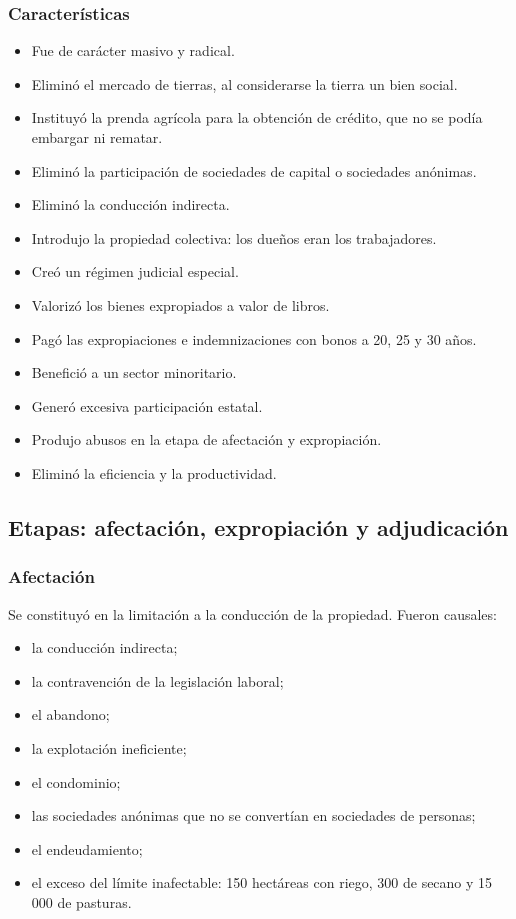\documentclass[
  man,
  floatsintext,
  longtable,
  a4paper,
  nolmodern,
  notxfonts,
  notimes,
  12pt,
  colorlinks=true,linkcolor=blue,citecolor=blue,urlcolor=blue]{apa7}
\providecommand{\tightlist}{%
  \setlength{\itemsep}{0pt}\setlength{\parskip}{0pt}}
\begin{document}
\subsubsection{Características}\label{caracteruxedsticas}

\begin{itemize}
\tightlist
\item
  Fue de carácter masivo y radical.
\item
  Eliminó el mercado de tierras, al considerarse la tierra un bien
  social.
\item
  Instituyó la prenda agrícola para la obtención de crédito, que no se
  podía embargar ni rematar.
\item
  Eliminó la participación de sociedades de capital o sociedades
  anónimas.
\item
  Eliminó la conducción indirecta.
\item
  Introdujo la propiedad colectiva: los dueños eran los trabajadores.
\item
  Creó un régimen judicial especial.
\item
  Valorizó los bienes expropiados a valor de libros.
\item
  Pagó las expropiaciones e indemnizaciones con bonos a 20, 25 y 30
  años.
\item
  Benefició a un sector minoritario.
\item
  Generó excesiva participación estatal.
\item
  Produjo abusos en la etapa de afectación y expropiación.
\item
  Eliminó la eficiencia y la productividad.
\end{itemize}

\subsection{Etapas: afectación, expropiación y
adjudicación}\label{etapas-afectaciuxf3n-expropiaciuxf3n-y-adjudicaciuxf3n}

\subsubsection{Afectación}\label{afectaciuxf3n}

Se constituyó en la limitación a la conducción de la propiedad. Fueron
causales:

\begin{itemize}
\tightlist
\item
  la conducción indirecta;
\item
  la contravención de la legislación laboral;
\item
  el abandono;
\item
  la explotación ineficiente;
\item
  el condominio;
\item
  las sociedades anónimas que no se convertían en sociedades de
  personas;
\item
  el endeudamiento;
\item
  el exceso del límite inafectable: 150 hectáreas con riego, 300 de
  secano y 15 000 de pasturas.
\end{itemize}
\end{document}
